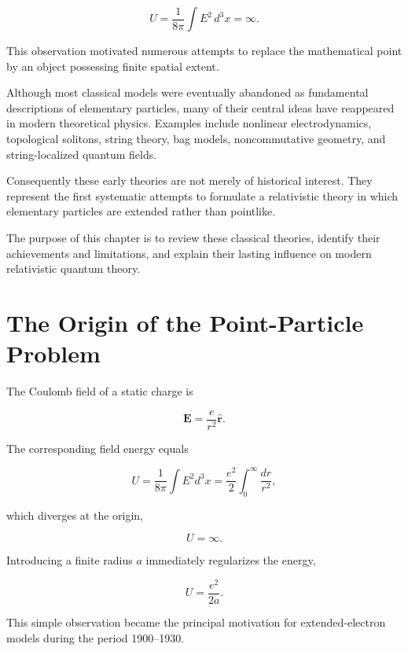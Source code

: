 \begin{equation}
U
=
\frac{1}{8\pi}
\int
E^2\,d^3x
=
\infty.
\end{equation}

This observation motivated numerous attempts to replace the mathematical point
by an object possessing finite spatial extent.

Although most classical models were eventually abandoned as fundamental
descriptions of elementary particles, many of their central ideas have
reappeared in modern theoretical physics. Examples include nonlinear
electrodynamics, topological solitons, string theory, bag models,
noncommutative geometry, and string-localized quantum fields.

Consequently these early theories are not merely of historical interest.
They represent the first systematic attempts to formulate a relativistic
theory in which elementary particles are extended rather than pointlike.

The purpose of this chapter is to review these classical theories, identify
their achievements and limitations, and explain their lasting influence on
modern relativistic quantum theory.
\section{The Origin of the Point-Particle Problem}

The Coulomb field of a static charge is

\begin{equation}
\mathbf E
=
\frac{e}{r^2}\hat{\mathbf r}.
\end{equation}

The corresponding field energy equals

\begin{equation}
U
=
\frac1{8\pi}
\int
E^2
d^3x
=
\frac{e^2}{2}
\int_0^\infty
\frac{dr}{r^2},
\end{equation}

which diverges at the origin,

\begin{equation}
U=\infty.
\end{equation}

Introducing a finite radius $a$ immediately regularizes the energy,

\begin{equation}
U
=
\frac{e^2}{2a}.
\end{equation}

This simple observation became the principal motivation for extended-electron
models during the period 1900--1930.
